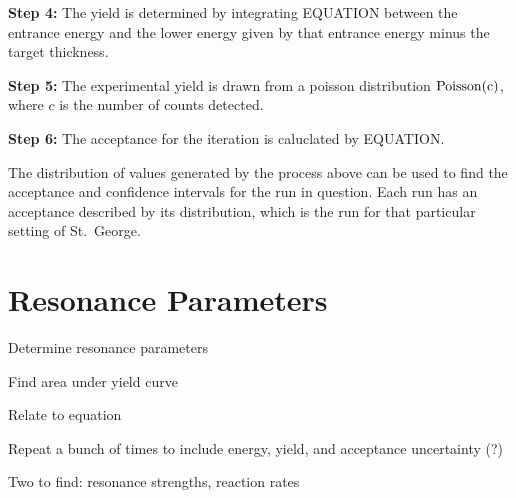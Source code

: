 \textbf{Step 4:}
  The yield is determined by integrating EQUATION between the
  entrance energy and the lower energy given by that entrance energy
  minus the target thickness.

\textbf{Step 5:}
  The experimental yield is drawn from a poisson distribution
  $\rm{Poisson}(c)$, where $c$ is the number of counts detected.

\textbf{Step 6:}
  The acceptance for the iteration is caluclated by EQUATION.

The distribution of values generated by the process above can be used to
find the acceptance and confidence intervals for the run in question.
Each run has an acceptance described by its distribution, which is the
run for that particular setting of St.\ George.


\section{Resonance Parameters}

Determine resonance parameters

Find area under yield curve

Relate to equation

Repeat a bunch of times to include energy, yield, and acceptance uncertainty (?)

Two to find: resonance strengths, reaction rates
